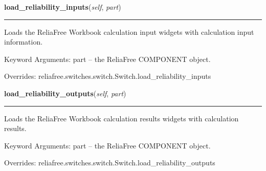     \vspace{0.5ex}

\hspace{.8\funcindent}\begin{boxedminipage}{\funcwidth}

    \raggedright \textbf{load\_reliability\_inputs}(\textit{self}, \textit{part})

    \vspace{-1.5ex}

    \rule{\textwidth}{0.5\fboxrule}
\setlength{\parskip}{2ex}
    Loads the ReliaFree Workbook calculation input widgets with calculation
    input information.

    Keyword Arguments: part -- the ReliaFree COMPONENT object.

\setlength{\parskip}{1ex}
      Overrides: reliafree.switches.switch.Switch.load\_reliability\_inputs

    \end{boxedminipage}

    \vspace{0.5ex}

\hspace{.8\funcindent}\begin{boxedminipage}{\funcwidth}

    \raggedright \textbf{load\_reliability\_outputs}(\textit{self}, \textit{part})

    \vspace{-1.5ex}

    \rule{\textwidth}{0.5\fboxrule}
\setlength{\parskip}{2ex}
    Loads the ReliaFree Workbook calculation results widgets with 
    calculation results.

    Keyword Arguments: part -- the ReliaFree COMPONENT object.

\setlength{\parskip}{1ex}
      Overrides: reliafree.switches.switch.Switch.load\_reliability\_outputs

    \end{boxedminipage}

    \label{reliafree:switches:toggle:Toggle:calculate_mil_217_count}

    \vspace{0.5ex}

